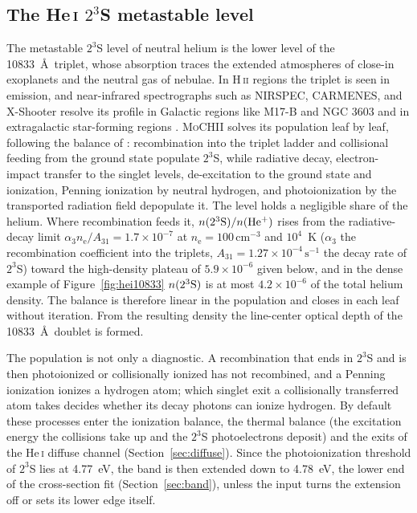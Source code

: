 \documentclass[twocolumn,linenumbers]{aastex702}
\newcommand{\MoCHII}{\textsc{MoCHII}}
\newcommand{\HII}{H\,\textsc{ii}}
\newcommand{\HeI}{He\,\textsc{i}}
\newcommand{\nelec}{n_{\mathrm{e}}}
\begin{document}
\subsection{The \HeI{} \texorpdfstring{$2^3$S}{2 3S} metastable level}
\label{sec:heimeta}

The metastable $2^3$S level of neutral helium is the lower level of the
10833~\AA\ triplet, whose absorption traces the extended atmospheres of
close-in exoplanets and the neutral gas of nebulae.  In \HII{} regions the
triplet is seen in emission, and near-infrared spectrographs such as
NIRSPEC, CARMENES, and X-Shooter resolve its profile in Galactic regions
like M17-B and NGC 3603 and in extragalactic star-forming regions
\citep{draine2026}.  \MoCHII{} solves its
population leaf by leaf, following the balance of \citet{oklopcic2018}:
recombination into the triplet ladder and collisional feeding from the
ground state populate $2^3$S, while radiative decay, electron-impact
transfer to the singlet levels, de-excitation to the ground state and
ionization, Penning ionization by neutral hydrogen, and photoionization by
the transported radiation field depopulate it.  The level holds a
negligible share of the helium.  Where recombination feeds it,
$n(2^3{\rm S})/n({\rm He^+})$ rises from the radiative-decay limit
$\alpha_3\nelec/A_{31} = 1.7\times10^{-7}$ at $\nelec =
100\,\mathrm{cm^{-3}}$ and $10^4$~K ($\alpha_3$ the recombination
coefficient into the triplets, $A_{31} = 1.27\times10^{-4}\,\mathrm{s^{-1}}$
the decay rate of $2^3$S) toward the high-density plateau of
$5.9\times10^{-6}$ given below, and in the dense example of
Figure~\ref{fig:hei10833} $n(2^3{\rm S})$ is at most $4.2\times10^{-6}$ of
the total helium density.  The balance is therefore linear in the
population and closes in each leaf without iteration.  From the resulting
density the line-center optical depth of the 10833~\AA\ doublet is formed.

The population is not only a diagnostic.  A recombination that ends in
$2^3$S and is then photoionized or collisionally ionized has not
recombined, and a Penning ionization ionizes a hydrogen atom; which singlet
exit a collisionally transferred atom takes decides whether its decay
photons can ionize hydrogen.  By default these processes enter the
ionization balance, the thermal balance (the excitation energy the
collisions take up and the $2^3$S photoelectrons deposit) and the exits of
the \HeI{} diffuse channel (Section~\ref{sec:diffuse}).  Since the
photoionization threshold of $2^3$S lies at 4.77~eV, the band is then
extended down to 4.78~eV, the lower end of the cross-section fit
(Section~\ref{sec:band}), unless the input turns the extension off or sets
its lower edge itself.
\end{document}
